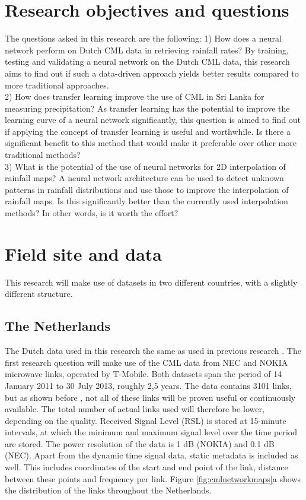 \documentclass[twocolumn, 10pt, a4paper]{article}
\begin{document}
	
	\section{Research objectives and questions}
	
	The questions asked in this research are the following:
	1) How does a neural network perform on Dutch CML data in retrieving rainfall rates? By training, testing and validating a neural network on the Dutch CML data, this research aims to find out if such a data-driven approach yields better results compared to more traditional approaches.\\
	2) How does transfer learning improve the use of CML in Sri Lanka for measuring precipitation? As transfer learning has the potential to improve the learning curve of a neural network significantly, this question is aimed to find out if applying the concept of transfer learning is useful and worthwhile. Is there a significant benefit to this method that would make it preferable over other more traditional methods?\\
	3) What is the potential of the use of neural networks for 2D interpolation of rainfall maps? A neural network architecture can be used to detect unknown patterns in rainfall distributions and use those to improve the interpolation of rainfall maps. Is this significantly better than the currently used interpolation methods? In other words, is it worth the effort?\\
		
	\section{Field site and data}
	This research will make use of datasets in two different countries, with a slightly different structure.
	\subsection{The Netherlands}
	The Dutch data used in this research the same as used in previous research \cite{Overeem2016}.
	The first research question will make use of the CML data from NEC and NOKIA microwave links, operated by T-Mobile. Both datasets span the period of 14 January 2011 to 30 July 2013, roughly 2,5 years. The data contains 3101 links, but as shown before \cite{Overeem2016}, not all of these links will be proven useful or continuously available. The total number of actual links used will therefore be lower, depending on the quality. Received Signal Level (RSL)  is stored at 15-minute intervals, at which the minimum and maximum signal level over the time period are stored. The power resolution of the data is 1 dB (NOKIA) and 0.1 dB (NEC). 
	Apart from the dynamic time signal data, static metadata is included as well. This includes coordinates of the start and end point of the link, distance between these points and frequency per link. Figure \ref{fig:cmlnetworkmaps}a shows the distribution of the links throughout the Netherlands.
	
\end{document}
